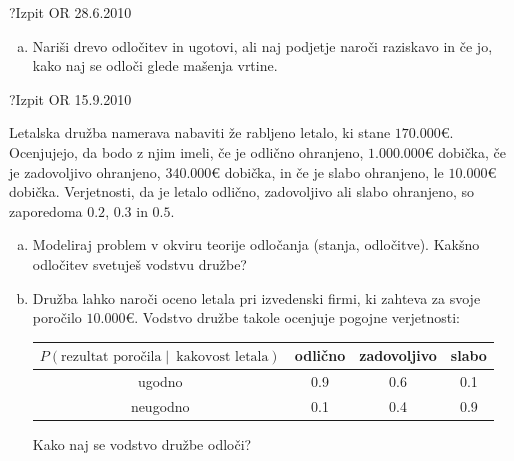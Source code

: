 \begin{naloga}{?}{Izpit OR 28.6.2010}
\begin{vprasanje}[bp]
\begin{enumerate}[(a)]
\item Nariši drevo odločitev in ugotovi,
ali naj podjetje naroči raziskavo in če jo,
kako naj se odloči glede mašenja vrtine.
\end{enumerate}
\end{vprasanje}
\begin{odgovor}
\end{odgovor}
\end{naloga}


\begin{naloga}{?}{Izpit OR 15.9.2010}
\begin{vprasanje}[rabljenoletalo]
Letalska družba namerava nabaviti že rabljeno letalo, ki stane $170.000 €$.
Ocenjujejo, da bodo z njim imeli,
če je odlično ohranjeno, $1.000.000 €$ dobička,
če je zadovoljivo ohranjeno, $340.000 €$ dobička,
in če je slabo ohranjeno, le $10.000 €$ dobička.
Verjetnosti, da je letalo odlično, zadovoljivo ali slabo ohranjeno,
so zaporedoma $0.2$, $0.3$ in $0.5$.
\begin{enumerate}[(a)]
\item Modeliraj problem v okviru teorije odločanja (stanja, odločitve).
Kakšno odločitev svetuješ vodstvu družbe?

\item Družba lahko naroči oceno letala pri izvedenski firmi,
ki zahteva za svoje poročilo $10.000 €$.
Vodstvo družbe takole ocenjuje pogojne verjetnosti:
\begin{center}
\begin{tabular}{c|ccc}
$P(\text{rezultat poročila} \;|\;\ \text{kakovost letala})$
& odlično & zadovoljivo & slabo \\ \hline
ugodno & 0.9 & 0.6 & 0.1 \\
neugodno & 0.1 & 0.4 & 0.9
\end{tabular}
\end{center}
Kako naj se vodstvo družbe odloči?
\end{enumerate}

\end{vprasanje}
\begin{odgovor}
\end{odgovor}
\end{naloga}


